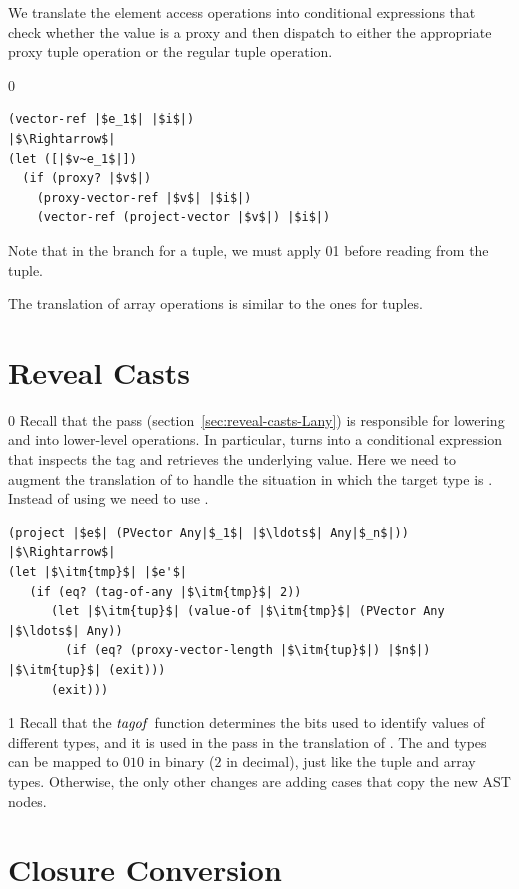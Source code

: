 \documentclass[7x10]{TimesAPriori_MIT}%
\def\racketEd{0}
\def\pythonEd{1}
\def\edition{1}
\newcommand{\racket}[1]{{\if\edition\racketEd{#1}\fi}}
\newcommand{\pythonColor}[0]{}
\newcommand{\python}[1]{{\if\edition\pythonEd\pythonColor #1\fi}}
\numberwithin{theorem}{chapter}
\numberwithin{definition}{chapter}
\numberwithin{equation}{chapter}
\begin{document}
We translate the element access operations into conditional
expressions that check whether the value is a proxy and then dispatch
to either the appropriate proxy tuple operation or the regular tuple
operation.
{\if\edition\racketEd    
\begin{lstlisting}
(vector-ref |$e_1$| |$i$|)
|$\Rightarrow$|
(let ([|$v~e_1$|])
  (if (proxy? |$v$|)
    (proxy-vector-ref |$v$| |$i$|)
    (vector-ref (project-vector |$v$|) |$i$|)
\end{lstlisting}
\fi}
%
Note that in the branch for a tuple, we must apply
\racket{}\python{} before reading
from the tuple.

The translation of array operations is similar to the ones for tuples.


\section{Reveal Casts }
\label{sec:reveal-casts-gradual}

{\if\edition\racketEd    
Recall that the  pass
(section~\ref{sec:reveal-casts-Lany}) is responsible for lowering
 and  into lower-level operations.
%
In particular,  turns into a conditional expression that
inspects the tag and retrieves the underlying value.  Here we need to
augment the translation of  to handle the situation in which
the target type is .  Instead of using
 we need to use .
\begin{lstlisting}
(project |$e$| (PVector Any|$_1$| |$\ldots$| Any|$_n$|))
|$\Rightarrow$|
(let |$\itm{tmp}$| |$e'$|
   (if (eq? (tag-of-any |$\itm{tmp}$| 2))
      (let |$\itm{tup}$| (value-of |$\itm{tmp}$| (PVector Any |$\ldots$| Any))
        (if (eq? (proxy-vector-length |$\itm{tup}$|) |$n$|) |$\itm{tup}$| (exit)))
      (exit)))
\end{lstlisting}
\fi}
%
{\if\edition\pythonEd\pythonColor
Recall that the $\mathit{tagof}$ function determines the bits used to
identify values of different types, and it is used in the 
pass in the translation of . The \PTUPLETYNAME{} and
\PARRAYTYNAME{} types can be mapped to $010$ in binary ($2$ in
decimal), just like the tuple and array types.
\fi}  
%
Otherwise, the only other changes are adding cases that copy the new AST nodes.

\pagebreak

\section{Closure Conversion }
\label{sec:closure-conversion-gradual}
\end{document}
